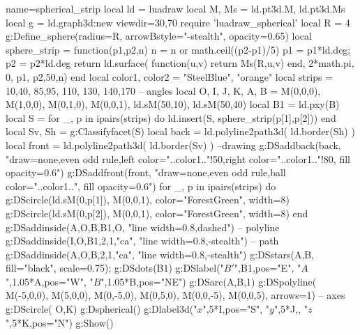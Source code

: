 \documentclass[border=5pt]{standalone}%
\begin{document}
\begin{luadraw}{name=spherical_strip}
local ld = luadraw
local M, Ms = ld.pt3d.M, ld.pt3d.Ms
local g = ld.graph3d:new{ viewdir={30,70} }
require 'luadraw_spherical'
local R = 4
g:Define_sphere({radius=R, arrowBstyle="-stealth", opacity=0.65})
local sphere_strip = function(p1,p2,n)
   n = n or math.ceil((p2-p1)/5)
   p1 = p1*ld.deg; p2 = p2*ld.deg
   return ld.surface( function(u,v) return Ms(R,u,v) end, 2*math.pi, 0, p1, p2,{50,n})
end
local color1, color2 = "SteelBlue", "orange"
local strips ={ {10,40}, {85,95}, {110, 130}, {140,170} } -- angles
local O, I, J, K, A, B = M(0,0,0), M(1,0,0), M(0,1,0), M(0,0,1), ld.sM(50,10), ld.sM(50,40)
local B1 = ld.pxy(B)
local S = {}
for _, p in ipairs(strips) do
   ld.insert(S, sphere_strip(p[1],p[2]))
end
local Sv, Sh = g:Classifyfacet(S)
local back = ld.polyline2path3d( ld.border(Sh) )
local front = ld.polyline2path3d( ld.border(Sv) )
--drawing
g:DSaddback(back, "draw=none,even odd rule,left color="..color1.."!50,right color="..color1.."!80, fill opacity=0.6")
g:DSaddfront(front, "draw=none,even odd rule,ball color="..color1..", fill opacity=0.6")
for _, p in ipairs(strips) do
g:DScircle({ld.sM(0,p[1]), M(0,0,1)}, {color="ForestGreen", width=8})
g:DScircle({ld.sM(0,p[2]), M(0,0,1)}, {color="ForestGreen", width=8})
end
g:DSaddinside({A,O,B,B1,O}, "line width=0.8,dashed") -- polyline
g:DSaddinside({I,O,B1,2,1,"ca"}, "line width=0.8,-stealth") -- path
g:DSaddinside({A,O,B,2,1,"ca"}, "line width=0.8,-stealth")
g:DSstars({A,B}, {fill="black", scale=0.75}); g:DSdots(B1)
g:DSlabel("$B'$",B1,{pos="E"}, "$A$",1.05*A,{pos="W"}, "$B$",1.05*B,{pos="NE"})
g:DSarc({A,B},1)
g:DSpolyline( {{M(-5,0,0), M(5,0,0)}, {M(0,-5,0), M(0,5,0)}, {M(0,0,-5), M(0,0,5)}}, {arrows=1}) -- axes
g:DScircle( {O,K})
g:Dspherical()
g:Dlabel3d("$x$",5*I,{pos="S"}, "$y$",5*J,{}, "$z$",5*K,{pos="N"})
g:Show()
\end{luadraw}
\end{document}
